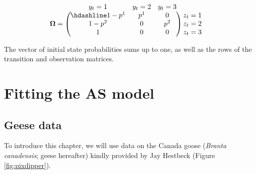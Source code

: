 \documentclass[
  12pt,
]{krantz}
\begin{document}
\[\begin{matrix}
& \\
\mathbf{\Omega} =
    \left ( \vphantom{ \begin{matrix} 12 \\ 12 \\ 12 \end{matrix} } \right .
\end{matrix}
\hspace{-1.2em}
\begin{matrix}
    y_t=1 & y_t=2 & y_t=3 \\ \hdashline
1 - p^1 & p^1 & 0\\
1 - p^2 & 0 & p^2\\
1 & 0 & 0
\end{matrix}
\hspace{-0.2em}
\begin{matrix}
& \\
\left . \vphantom{ \begin{matrix} 12 \\ 12 \\ 12 \end{matrix} } \right )
    \begin{matrix}
    z_{t}=1 \\ z_{t}=2 \\ z_{t}=3
    \end{matrix}
\end{matrix}\]

The vector of initial state probabilities sums up to one, as well as the rows of the transition and observation matrices.

\section{Fitting the AS model}\label{ASmodelfitting}

\subsection{Geese data}\label{geese-data}

To introduce this chapter, we will use data on the Canada goose (\emph{Branta canadensis}; geese hereafter) kindly provided by Jay Hestbeck (Figure \ref{fig:pixdipper}).
\end{document}
